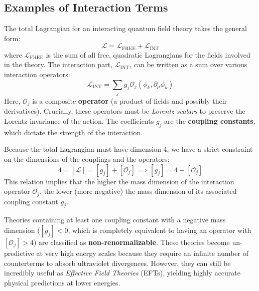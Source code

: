 \subsection{Examples of Interaction Terms}

The total Lagrangian for an interacting quantum field theory takes the general form:
\[
    \mathcal{L} = \mathcal{L}_{\text{FREE}} + \mathcal{L}_{\text{INT}}
\]
where \(\mathcal{L}_{\text{FREE}}\) is the sum of all free, quadratic Lagrangians for the fields involved in the theory. The interaction part, \(\mathcal{L}_{\text{INT}}\), can be written as a sum over various interaction operators:
\[
    \mathcal{L}_{\text{INT}} = \sum_j g_j \mathcal{O}_j(\phi_k, \partial_\mu \phi_k)
\]
Here, \(\mathcal{O}_j\) is a composite \textbf{operator} (a product of fields and possibly their derivatives). Crucially, these operators must be \textit{Lorentz scalars} to preserve the Lorentz invariance of the action. The coefficients \(g_j\) are the \textbf{coupling constants}, which dictate the strength of the interaction.

Because the total Lagrangian must have dimension 4, we have a strict constraint on the dimensions of the couplings and the operators:
\[
    4 = [\mathcal{L}] = [g_j] + [\mathcal{O}_j] \implies [g_j] = 4 - [\mathcal{O}_j]
\]
This relation implies that the higher the mass dimension of the interaction operator \(\mathcal{O}_j\), the lower (more negative) the mass dimension of its associated coupling constant \(g_j\).

\begin{remark}
    Theories containing at least one coupling constant with a negative mass dimension (\([g_j] < 0\), which is completely equivalent to having an operator with \([\mathcal{O}_j] > 4\)) are classified as \textbf{non-renormalizable}. These theories become un-predictive at very high energy scales because they require an infinite number of counterterms to absorb ultraviolet divergences. However, they can still be incredibly useful as \textit{Effective Field Theories} (EFTs), yielding highly accurate physical predictions at lower energies.
\end{remark}


